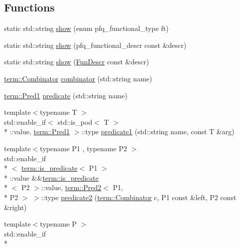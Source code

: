 \subsection*{Functions}
\begin{DoxyCompactItemize}
\item 
static std\+::string \hyperlink{namespacepfq__lang_a8fd413aae51832e7fc7f727dae11129c}{show} (enum pfq\+\_\+functional\+\_\+type ft)
\item 
static std\+::string \hyperlink{namespacepfq__lang_a1a60cc110a7a44a7d94775d5d6b1692d}{show} (pfq\+\_\+functional\+\_\+descr const \&descr)
\item 
static std\+::string \hyperlink{namespacepfq__lang_a35c9e73911d862b90ecfeb32fbfcfc8f}{show} (\hyperlink{structpfq__lang_1_1FunDescr}{Fun\+Descr} const \&descr)
\item 
\hyperlink{structpfq__lang_1_1term_1_1Combinator}{term\+::\+Combinator} \hyperlink{namespacepfq__lang_a35f3de0a6684c64d0465aa3f263fa8a6}{combinator} (std\+::string name)
\item 
\hyperlink{structpfq__lang_1_1term_1_1Pred1}{term\+::\+Pred1} \hyperlink{namespacepfq__lang_abd58b2244ff8b0775a3b5865bc128872}{predicate} (std\+::string name)
\item 
{\footnotesize template$<$typename T $>$ }\\std\+::enable\+\_\+if$<$ std\+::is\+\_\+pod$<$ T $>$\\*
\+::value, \hyperlink{structpfq__lang_1_1term_1_1Pred1}{term\+::\+Pred1} $>$\+::type \hyperlink{namespacepfq__lang_ae23a03cee94b5ddfde4a8d2e5c521f0e}{predicate1} (std\+::string name, const T \&arg)
\item 
{\footnotesize template$<$typename P1 , typename P2 $>$ }\\std\+::enable\+\_\+if\\*
$<$ \hyperlink{structpfq__lang_1_1term_1_1is__predicate}{term\+::is\+\_\+predicate}$<$ P1 $>$\\*
\+::value \&\&\hyperlink{structpfq__lang_1_1term_1_1is__predicate}{term\+::is\+\_\+predicate}\\*
$<$ P2 $>$\+::value, \hyperlink{structpfq__lang_1_1term_1_1Pred2}{term\+::\+Pred2}$<$ P1, \\*
P2 $>$ $>$\+::type \hyperlink{namespacepfq__lang_a89ea436faf8b7f13512e07efbce83b41}{predicate2} (\hyperlink{structpfq__lang_1_1term_1_1Combinator}{term\+::\+Combinator} c, P1 const \&left, P2 const \&right)
\item 
{\footnotesize template$<$typename P $>$ }\\std\+::enable\+\_\+if\\*

\end{DoxyCompactItemize}
